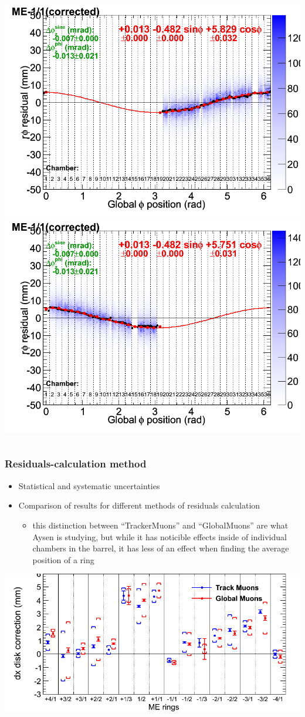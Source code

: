 \documentclass[compress]{beamer}
\begin{document}
\begin{frame}
\begin{columns}
\includegraphics[width=0.5\linewidth]{vsphi_systematic3.png}
\includegraphics[width=0.5\linewidth]{vsphi_systematic4.png}
\end{columns}
\end{frame}

\begin{frame}
\frametitle{Residuals-calculation method}

\begin{itemize}
\item Statistical and systematic uncertainties
\item Comparison of results for different methods of residuals calculation
\begin{itemize}
\item this distinction between ``TrackerMuons'' and ``GlobalMuons''
  are what Aysen is studying, but while it has noticible effects
  inside of individual chambers in the barrel, it has less of an
  effect when finding the average position of a ring
\end{itemize}
\end{itemize}

\vfill
\includegraphics[width=\linewidth]{finaltkgb1.png}
\end{frame}
\end{document}
